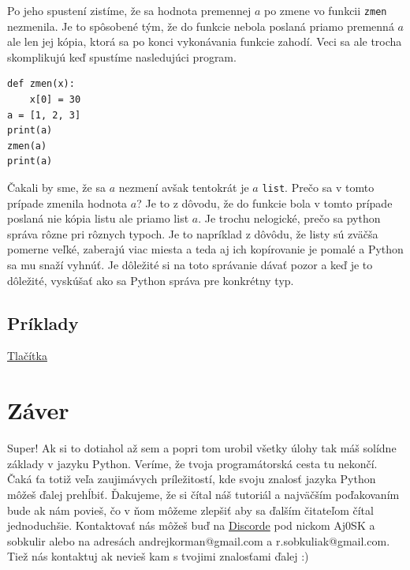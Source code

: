 \documentclass{article}
\begin{document}
Po jeho spustení zistíme, že sa hodnota premennej $a$ po zmene vo funkcii \texttt{zmen} nezmenila. Je to spôsobené tým, že do funkcie nebola poslaná priamo premenná $a$ ale len jej kópia, ktorá sa po konci vykonávania funkcie zahodí. Veci sa ale trocha skomplikujú keď spustíme nasledujúci program.

\begin{lstlisting}
def zmen(x):
    x[0] = 30
a = [1, 2, 3]
print(a)
zmen(a)
print(a)
\end{lstlisting}

Čakali by sme, že sa $a$ nezmení avšak tentokrát je $a$ \texttt{list}. Prečo sa v tomto prípade zmenila hodnota $a$? Je to z dôvodu, že do funkcie bola v tomto prípade poslaná nie kópia listu ale priamo list $a$. Je trochu nelogické, prečo sa python správa rôzne pri rôznych typoch. Je to napríklad z dôvôdu, že listy sú zväčša pomerne veľké, zaberajú viac miesta a teda aj ich kopírovanie je pomalé a Python sa mu snaží vyhnúť. Je dôležité si na toto správanie dávať pozor a keď je to dôležité, vyskúšať ako sa Python správa pre konkrétny typ.

\subsection{Príklady}
\href{https://testovac.ksp.sk/tasks/ls-uvod-tlacitka/}{Tlačítka}

\section{Záver}

Super! Ak si to dotiahol až sem a popri tom urobil všetky úlohy tak máš solídne základy v jazyku Python. Veríme, že tvoja programátorská cesta tu nekončí. Čaká ťa totiž veľa zaujimávych príležitostí, kde svoju znalosť jazyka Python môžeš ďalej prehĺbiť. Ďakujeme, že si čítal náš tutoriál a najväčším poďakovaním bude ak nám povieš, čo v ňom môžeme zlepšiť aby sa ďalším čitateľom čítal jednoduchšie. Kontaktovať nás môžeš buď na \href{https://discord.gg/QKgNmW9}{Discorde} pod nickom Aj0SK a sobkulir alebo na adresách andrejkorman@gmail.com a r.sobkuliak@gmail.com. Tiež nás kontaktuj ak nevieš kam s tvojimi znalosťami ďalej :)


\end{document}
